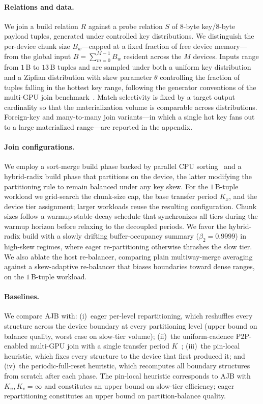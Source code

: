 \documentclass{article}
\begin{document}
\paragraph{Relations and data.}
We join a build relation $R$ against a probe relation $S$ of $8$-byte
key/$8$-byte payload tuples, generated under controlled key distributions. We
distinguish the per-device chunk size $B_w$---capped at a fixed fraction of free
device memory---from the global input $B = \sum_{m=0}^{M-1} B_w$ resident across
the $M$ devices. Inputs range from $1$\,B to $13$\,B tuples and are sampled under
both a uniform key distribution and a Zipfian distribution with skew parameter
$\theta$ controlling the fraction of tuples falling in the hottest key range,
following the generator conventions of the multi-GPU join
benchmark~\citep{maltry2025multigpu}. Match selectivity is fixed by a target
output cardinality so that the materialization volume is comparable across
distributions. Foreign-key and many-to-many join variants---in which a single
hot key fans out to a large materialized range---are reported in the appendix.

\paragraph{Join configurations.}
We employ a sort-merge build phase backed by parallel CPU
sorting~\citep{kim2009sortvshash} and a hybrid-radix build phase that partitions
on the device, the latter modifying the partitioning rule to remain balanced
under any key skew. For the $1$\,B-tuple workload we grid-search the chunk-size
cap, the base transfer period $K_x$, and the device tier assignment; larger
workloads reuse the resulting configuration. Chunk sizes follow a
warmup-stable-decay schedule that synchronizes all tiers during the warmup
horizon before relaxing to the decoupled periods. We favor the hybrid-radix
build with a slowly drifting buffer-occupancy summary ($\beta_2 = 0.9999$) in
high-skew regimes, where eager re-partitioning otherwise thrashes the slow tier.
We also ablate the host re-balancer, comparing plain multiway-merge averaging
against a skew-adaptive re-balancer that biases boundaries toward dense ranges,
on the $1$\,B-tuple workload.

\paragraph{Baselines.}
We compare AJB with: (i)~eager per-level repartitioning, which reshuffles every
structure across the device boundary at every partitioning level (upper bound on
balance quality, worst case on slow-tier volume); (ii)~the uniform-cadence
P2P-enabled multi-GPU join with a single transfer period
$K$~\citep{maltry2025multigpu}; (iii)~the pin-local heuristic, which fixes every
structure to the device that first produced it; and (iv)~the periodic-full-reset
heuristic, which recomputes all boundary structures from scratch after each
phase. The pin-local heuristic corresponds to AJB with $K_u, K_v = \infty$ and
constitutes an upper bound on slow-tier efficiency; eager repartitioning
constitutes an upper bound on partition-balance quality.
\end{document}

